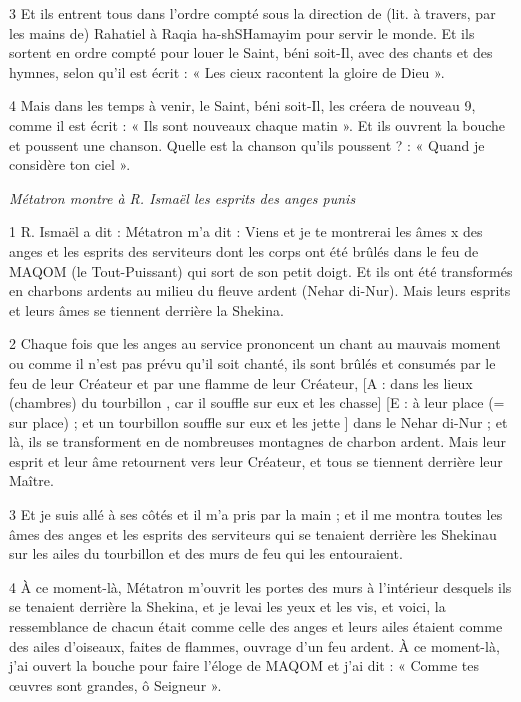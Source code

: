 \par 3 Et ils entrent tous dans l'ordre compté sous la direction de (lit. à travers, par les mains de) Rahatiel à Raqia ha-shSHamayim pour servir le monde. Et ils sortent en ordre compté pour louer le Saint, béni soit-Il, avec des chants et des hymnes, selon qu'il est écrit : « Les cieux racontent la gloire de Dieu ».

\par 4 Mais dans les temps à venir, le Saint, béni soit-Il, les créera de nouveau 9, comme il est écrit : « Ils sont nouveaux chaque matin ». Et ils ouvrent la bouche et poussent une chanson. Quelle est la chanson qu'ils poussent ? : « Quand je considère ton ciel ».


\par \textit{Métatron montre à R. Ismaël les esprits des anges punis}

\par 1 R. Ismaël a dit : Métatron m'a dit : Viens et je te montrerai les âmes x des anges et les esprits des serviteurs dont les corps ont été brûlés dans le feu de MAQOM (le Tout-Puissant) qui sort de son petit doigt. Et ils ont été transformés en charbons ardents au milieu du fleuve ardent (Nehar di-Nur). Mais leurs esprits et leurs âmes se tiennent derrière la Shekina.

\par 2 Chaque fois que les anges au service prononcent un chant au mauvais moment ou comme il n'est pas prévu qu'il soit chanté, ils sont brûlés et consumés par le feu de leur Créateur et par une flamme de leur Créateur, [A : dans les lieux (chambres) du tourbillon , car il souffle sur eux et les chasse] [E : à leur place (= sur place) ; et un tourbillon souffle sur eux et les jette ] dans le Nehar di-Nur ; et là, ils se transforment en de nombreuses montagnes de charbon ardent. Mais leur esprit et leur âme retournent vers leur Créateur, et tous se tiennent derrière leur Maître.

\par 3 Et je suis allé à ses côtés et il m'a pris par la main ; et il me montra toutes les âmes des anges et les esprits des serviteurs qui se tenaient derrière les Shekinau sur les ailes du tourbillon et des murs de feu qui les entouraient.

\par 4 À ce moment-là, Métatron m'ouvrit les portes des murs à l'intérieur desquels ils se tenaient derrière la Shekina, et je levai les yeux et les vis, et voici, la ressemblance de chacun était comme celle des anges et leurs ailes étaient comme des ailes d'oiseaux, faites de flammes, ouvrage d'un feu ardent. À ce moment-là, j’ai ouvert la bouche pour faire l’éloge de MAQOM et j’ai dit : « Comme tes œuvres sont grandes, ô Seigneur ».

